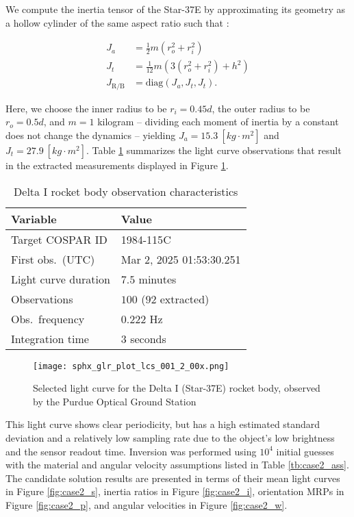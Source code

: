 \documentclass[a4paper,twocolumn]{spaceDebrisC} %
\newcommand{\figbig}[0]{0.5\textwidth}
\begin{document}
We compute the inertia tensor of the Star-37E by approximating its geometry as a hollow cylinder of the same aspect ratio such that \cite{serway2019}:

\begin{align}
 J_a &= \frac{1}{2} m \left(r_o^2+r_i^2\right) \\
 J_t &= \frac{1}{12} m \left(3 \left(r_o^2+r_i^2\right) + h^2\right) \\
 J_\text{R/B} &= \text{diag} \left(J_a, J_t, J_t\right).
\end{align}

Here, we choose the inner radius to be $r_i=0.45d$, the outer radius to be $r_o=0.5d$, and $m=1$ kilogram -- dividing each moment of inertia by a constant does not change the dynamics -- yielding $J_a = 15.3 \: [kg \cdot m^2]$ and $J_t = 27.9 \: [kg \cdot m^2]$. Table \ref{tb:case2_in} summarizes the light curve observations that result in the extracted measurements displayed in Figure \ref{fig:rb_lc_obs}.

\begin{table}[H]
  \centering
  \caption{Delta I rocket body observation characteristics}
  \vspace*{6pt}
  \begin{tabular}{|l|l|}
  \hline
  \textbf{Variable} & \textbf{Value} \\ \hline
 Target COSPAR ID & 1984-115C \\ \hline
 First obs.\ (UTC) & Mar 2, 2025 01:53:30.251 \\ \hline
 Light curve duration & $7.5$ minutes \\ \hline
 Observations & $100$ ($92$ extracted) \\ \hline
 Obs.\ frequency & $0.222$ Hz \\ \hline
 Integration time & $3$ seconds \\ \hline
  \end{tabular}
  \label{tb:case2_in}
\end{table}

\begin{figure}[H]
  \centering
  \texttt{[image: sphx\_glr\_plot\_lcs\_001\_2\_00x.png]}
  \caption{Selected light curve for the Delta I (Star-37E) rocket body, observed by the Purdue Optical Ground Station}
  \label{fig:rb_lc_obs}
\end{figure}

This light curve shows clear periodicity, but has a high estimated standard deviation and a relatively low sampling rate due to the object's low brightness and the sensor readout time. Inversion was performed using $10^4$ initial guesses with the material and angular velocity assumptions listed in Table \ref{tb:case2_ass}. The candidate solution results are presented in terms of their mean light curves in Figure \ref{fig:case2_s}, inertia ratios in Figure \ref{fig:case2_i}, orientation MRPs in Figure \ref{fig:case2_p}, and angular velocities in Figure \ref{fig:case2_w}.
\end{document}
